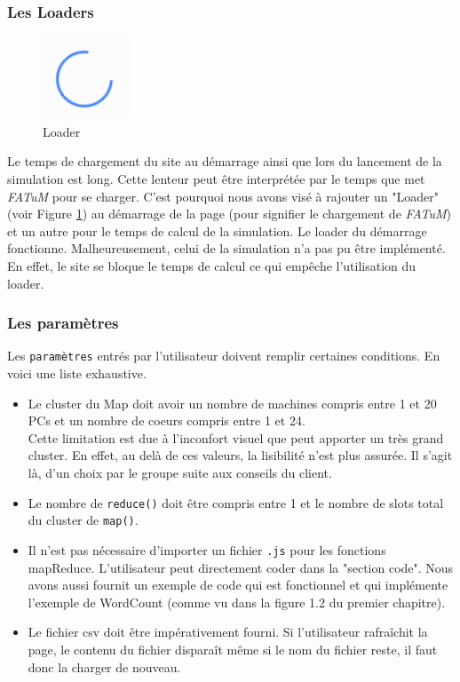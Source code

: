 \subsubsection{Les Loaders}
\begin{figure}[H]
  \centering
    \includegraphics[scale=0.5]{images/loader.png}
        \caption{Loader}
        \label{fig:loader}
\end{figure}
Le temps de chargement du site au démarrage ainsi que lors du lancement de la simulation est long. Cette lenteur peut être interprétée par le temps que met \textit{FATuM} pour se charger. C'est pourquoi nous avons visé à rajouter un "Loader" (voir Figure \ref{fig:loader}) au démarrage de la page (pour signifier le chargement de \textit{FATuM}) et un autre pour le temps de calcul de la simulation. Le loader du démarrage fonctionne. Malheureusement, celui de la simulation n'a pas pu être implémenté. En effet, le site se bloque le temps de calcul ce qui empêche l'utilisation du loader.

\newpage
\subsubsection{Les paramètres}
Les {\tt paramètres} entrés par l'utilisateur doivent remplir certaines conditions. En voici une liste exhaustive.
\begin{itemize}
\item Le cluster du Map doit avoir un nombre de machines compris entre 1 et 20 PCs et un nombre de coeurs compris entre 1 et 24. \\ Cette limitation est due à l'inconfort visuel que peut apporter un très grand cluster. En effet, au delà de ces valeurs, la lisibilité n'est plus assurée. Il s'agit là, d'un choix par le groupe suite aux conseils du client.
\item Le nombre de {\tt reduce()} doit être compris entre 1 et le nombre de slots total du cluster de {\tt map()}.
\item Il n'est pas nécessaire d'importer un fichier {\tt .js} pour les fonctions mapReduce. L'utilisateur peut directement coder  dans la "section code". Nous avons aussi fournit un exemple de code qui est fonctionnel et qui implémente l'exemple de WordCount (comme vu dans la figure 1.2 du premier chapitre).
\item Le fichier csv doit être impérativement fourni.
Si l'utilisateur rafraîchit la page, le contenu du fichier disparaît même si le nom du fichier reste, il faut donc la charger de nouveau.
\end{itemize}



